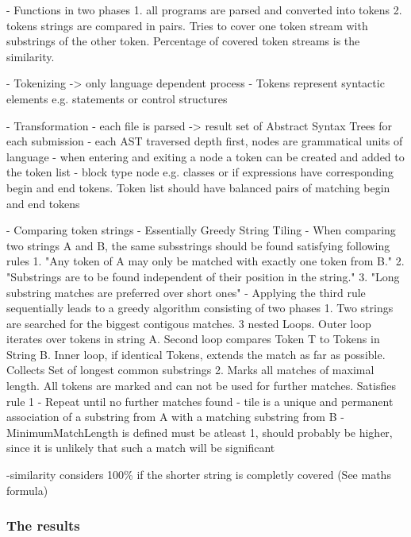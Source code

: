 \documentclass[a4paper, 11pt]{article}
\renewcommand{\\}{\vspace*{0.5\baselineskip} \newline}
\begin{document}
- Functions in two phases 
1. all programs are parsed and converted into tokens
2. tokens strings are compared in pairs. Tries to cover one token stream with substrings of the other token. Percentage of covered token streams is
the similarity. \autocite[p. 10]{JPlagP}

- Tokenizing -> only language dependent process\autocite[p. 10]{JPlagP}
- Tokens represent syntactic elements e.g. statements or control structures\autocite[How are submissions represented? — Notion of Token]{JPlagW4}

- Transformation
- each file is parsed -> result set of Abstract Syntax Trees for each submission
- each AST traversed depth first, nodes are  grammatical units of language
- when entering and exiting a node a token can be created and added to the token list
- block type node e.g. classes or if expressions have corresponding begin and end tokens. 
	Token list should have balanced pairs of matching begin and end tokens \autocite[How does the transformation work?]{JPlagW4}

- Comparing token strings
- Essentially Greedy String Tiling
- When comparing two strings A and B, the same subsstrings should be found satisfying following rules
1. "Any token of A may only be matched with exactly one token from B."
2. "Substrings are to be found independent of their position in the string."
3. "Long substring matches are preferred over short ones" \autocite[p. 11]{JPlagP}
- Applying the third rule sequentially leads to a greedy algorithm consisting of two phases
1. Two strings are searched for the biggest contigous matches. 3 nested Loops. Outer loop iterates over tokens in
	string A. Second loop compares Token T to Tokens in String B. Inner loop, if identical Tokens, extends the match
	as far as possible. Collects Set of longest common substrings
2. Marks all matches of maximal length. All tokens are marked and can not be used for further matches. Satisfies rule 1
- Repeat until no further matches found \autocite[p. 11]{JPlagP}
- tile is a unique and permanent association of a substring from A with a matching substring from B\autocite[p. 3]{GST}
- MinimumMatchLength is defined must be atleast 1, should probably be higher, since it is unlikely that such a match
	will be significant \autocite[GST]{GST}

-similarity considers 100\% if the shorter string is completly covered \autocite[p. 13]{JPlagP}(See maths formula)

\subsubsection{The results}
\end{document}

